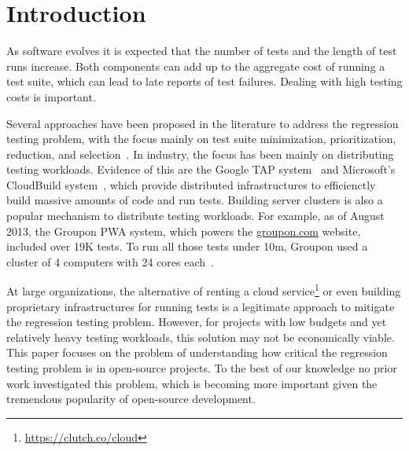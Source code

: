 \section{Introduction}


As software evolves it is expected that the number of tests and the
length of test runs increase.  Both components can add up to the
aggregate cost of running a test suite, which can lead to late reports
of test failures.  Dealing with high testing costs is important.

Several approaches have been proposed in the literature to address the
regression testing problem, with the focus mainly on test suite
minimization, prioritization, reduction, and
selection~\cite{yoo-harman-stvr2012}.  In industry, the focus has been
mainly on distributing testing workloads.  Evidence of this are the
Google TAP system~\cite{google-tap,google-ci} and Microsoft's
CloudBuild system~\cite{prasad-shulte-ieee-microsoft-ci}, which
provide distributed infrastructures to efficienctly build massive
amounts of code and run tests.  Building server clusters is also a
popular mechanism to distribute testing workloads.  For example, as of
August 2013, the Groupon PWA system, which powers the
\url{groupon.com} website, included over 19K tests.  To run all those
tests under 10m, Groupon used a cluster of 4 computers with 24 cores
each~\cite{kim-etal-fse2013}.

At large organizations, the alternative of renting a cloud
service\footnote{\url{https://clutch.co/cloud}} or even building
proprietary infrastructures for running tests is a legitimate approach
to mitigate the regression testing problem.  However, for projects
with low budgets and yet relatively heavy testing workloads, this
solution may not be economically viable.  This paper focuses on the
problem of understanding how critical the regression testing problem
is in open-source projects.  To the best of our knowledge no prior
work investigated this problem, which is becoming more important given
the tremendous popularity of open-source development.


